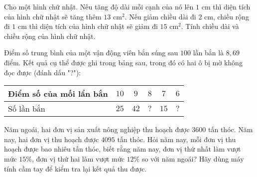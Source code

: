 \begin{bt}%
	Cho một hình chữ nhật. Nếu tăng độ dài mỗi cạnh của nó lên $1$ cm thì diện tích của hình chữ nhật sẽ tăng thêm $13$ cm$^2$. Nếu giảm chiều dài đi $2$ cm, chiều rộng đi $1$ cm thì diện tích của hình chữ nhật sẽ giảm đi $15$ cm$^2$. Tính chiều dài và chiều rộng của hình chữ nhật.
\end{bt}
\begin{bt}
	Điểm số trung bình của một vận động viên bắn súng sau $100$ lần bắn là $8{,}69$ điểm. Kết quả cụ thể được ghi trong bảng sau, trong đó có hai ô bị mờ không đọc được (đánh dấu "?"):\\
	\begin{center}
	\begin{tabular}{|l|c|c|c|c|c|}
	\hline Điểm số của mối lẩn bắn & $10$ & $9$ & $8$ & $7$ & $6$ \\
	\hline Số lần bắn & $25$ & $42$ & $?$ & $15$ & $?$ \\
	\hline
	\end{tabular}
	\end{center}
\end{bt}
\begin{bt}
	Năm ngoái, hai đơn vị sản xuất nông nghiệp thu hoạch được $ 3600 $ tấn thóc. Năm nay, hai đơn vị thu hoạch được $ 4095 $ tấn thóc. Hỏi năm nay, mỗi đơn vị thu hoạch được bao nhiêu tấn thóc, biết rằng năm nay, đơn vị thứ nhất làm vượt mức $15 \%$, đơn vị thứ hai làm vượt mức $12 \%$ so với năm ngoái?
	Hãy dùng máy tính cầm tay để kiểm tra lại kết quả thu được.
\end{bt}
